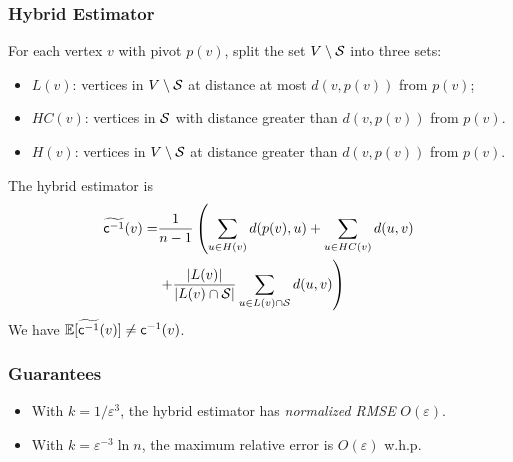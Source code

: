 \begin{frame}
  \frametitle{Hybrid Estimator}
  For each vertex $v$ with pivot $p(v)$, split the set $V\setminus{\cal S}$ into
  three sets:
  \pause
  \begin{itemize}
    \item $L(v)$: vertices in $V\setminus{\cal S}$ at distance at most $d(v,p(v))$
      from $p(v)$;
    \pause
    \item $HC(v)$: vertices in ${\cal S}$ with distance greater than $d(v,p(v))$
      from $p(v)$.
    \pause
    \item $H(v)$: vertices in $V\setminus{\cal S}$ at distance greater than
      $d(v,p(v))$ from $p(v)$.
  \end{itemize}
  \pause
  The hybrid estimator is
  \begin{align*}
    \widetilde{\mathsf{c}^{-1}}(v)=&\frac{1}{n-1}\left(\sum_{u\in
    H(v)}d(p(v),u)+\sum_{u\in HC(v)}d(u,v)\right.\\
    &\left.+\frac{|L(v)|}{|L(v)\cap{\cal S}|}\sum_{u\in L(v)\cap{\cal S}}d(u,v)\right)
  \end{align*}
  \pause
  We have $\mathbb{E}[\widetilde{\mathsf{c}^{-1}}(v)]\neq\mathsf{c}^{-1}(v)$.
\end{frame}

\begin{frame}
  \frametitle{Guarantees}
  \begin{theorem}
    \begin{itemize}
      \item With $k=1/\varepsilon^3$, the hybrid estimator has \emph{normalized
        RMSE} $O(\varepsilon)$.
      \item With $k=\varepsilon^{-3}\ln n$, the maximum relative error is
        $O(\varepsilon)$ w.h.p.
    \end{itemize}
  \end{theorem}
\end{frame}

